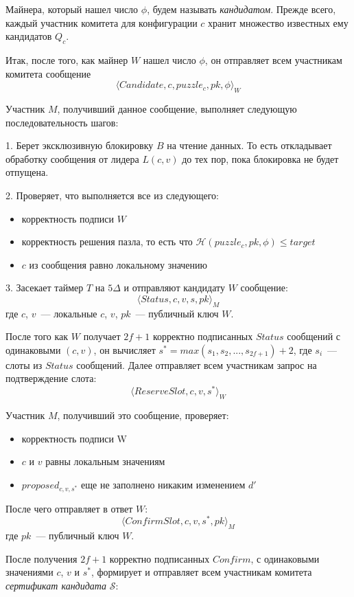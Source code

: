 Майнера, который нашел число $\phi$, будем называть \textit{кандидатом}.
Прежде всего, каждый участник комитета для конфигурации $c$ хранит множество известных ему кандидатов $Q_c$.
\vspace{10pt}

Итак, после того, как майнер $W$ нашел число $\phi$, он отправляет всем участникам комитета сообщение
 \[ \langle Candidate, c, puzzle_c, pk, \phi \rangle_W \]
 
Участник $M$, получивший данное сообщение, выполняет следующую последовательность шагов:

1. Берет эксклюзивную блокировку $B$ на чтение данных. То есть откладывает обработку сообщения от лидера $L(c, v)$ до тех пор, пока блокировка не будет отпущена. 

2. Проверяет, что выполняется все из следующего:
\begin{itemize}
\item корректность подписи $W$ 
\item корректность решения пазла, то есть что $\mathcal{H}(puzzle_c, pk, \phi) \le target$
\item $c$ из сообщения равно локальному значению
\end{itemize}

3. Засекает таймер $T$ на $5\Delta$ и отправляют кандидату $W$ сообщение:
 \[ \langle Status, c, v, s, pk \rangle_M \]
где $c$, $v$~--- локальные  $c$, $v$, $pk$~--- публичный ключ $W$.
\vspace{10pt}

После того как $W$ получает $2f+1$ корректно подписанных $Status$ сообщений с одинаковыми $(c, v)$, он вычисляет $s^{*}=max(s_1, s_2,..., s_{2f+1})+2$, где $s_i$~--- слоты из $Status$ сообщений.
Далее отправляет всем участникам запрос на подтверждение слота:
 \[ \langle ReserveSlot, c, v, s^{*} \rangle_W \]
 
\noindent Участник $M$, получивший это сообщение, проверяет:
\begin{itemize}
\item корректность подписи W
\item $c$ и $v$ равны локальным значениям
\item $proposed_{c, v, s^{*}}$ еще не заполнено никаким изменением $d'$
\end{itemize} 
После чего отправляет в ответ $W$:
 \[ \langle ConfirmSlot, c, v, s^{*}, pk \rangle_M \]
где $pk$~--- публичный ключ $W$.
\vspace{10pt}

После получения $2f+1$ корректно подписанных $Confirm$, с одинаковыми значениями $c$, $v$ и $s^{*}$,
формирует и отправляет всем участникам комитета \textit{сертификат кандидата} $\mathcal{S}$:

